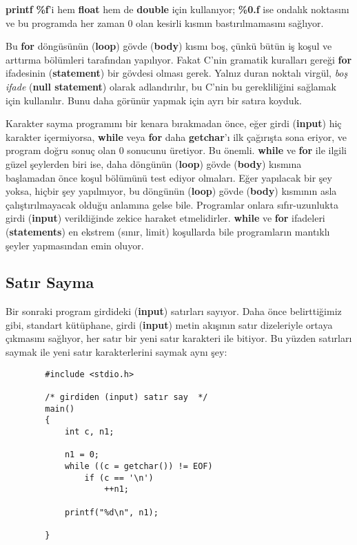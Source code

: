 \documentclass[a4paper,12pt,oneside]{book}
\begin{document}
\textbf{printf} \textbf{\%f}'i hem \textbf{float} hem de \textbf{double} için kullanıyor; \textbf{\%0.f} ise ondalık noktasını ve bu programda her zaman 0 olan kesirli kısmın bastırılmamasını sağlıyor.
\par Bu \textbf{for} döngüsünün (\textbf{loop}) gövde (\textbf{body}) kısmı boş, çünkü bütün iş koşul ve arttırma bölümleri tarafından yapılıyor. Fakat C'nin gramatik kuralları gereği \textbf{for} ifadesinin (\textbf{statement}) bir gövdesi olması gerek. Yalnız duran noktalı virgül, \textit{boş ifade} (\textbf{null statement}) olarak adlandırılır, bu C'nin bu gerekliliğini sağlamak için kullanılır. Bunu daha görünür yapmak için ayrı bir satıra koyduk.
\par Karakter sayma programını bir kenara bırakmadan önce, eğer girdi (\textbf{input}) hiç karakter içermiyorsa, \textbf{while} veya \textbf{for} daha \textbf{getchar}'ı ilk çağırışta sona eriyor, ve program doğru sonuç olan 0 sonucunu üretiyor. Bu önemli. \textbf{while} ve \textbf{for} ile ilgili güzel şeylerden biri ise, daha döngünün (\textbf{loop}) gövde (\textbf{body}) kısmına başlamadan önce koşul bölümünü test ediyor olmaları. Eğer yapılacak bir şey yoksa, hiçbir şey yapılmıyor, bu döngünün (\textbf{loop}) gövde (\textbf{body}) kısmının asla çalıştırılmayacak olduğu anlamına gelse bile. Programlar onlara sıfır-uzunlukta girdi (\textbf{input}) verildiğinde zekice haraket etmelidirler. \textbf{while} ve \textbf{for} ifadeleri (\textbf{statements}) en ekstrem (sınır, limit) koşullarda bile programların mantıklı şeyler yapmasından emin oluyor.

\subsection{Satır Sayma}

Bir sonraki program girdideki (\textbf{input}) satırları sayıyor. Daha önce belirttiğimiz gibi, standart kütüphane, girdi (\textbf{input}) metin akışının satır dizeleriyle ortaya çıkmasını sağlıyor, her satır bir yeni satır karakteri ile bitiyor. Bu yüzden satırları saymak ile yeni satır karakterlerini saymak aynı şey:

\begin{lstlisting}
		#include <stdio.h>

		/* girdiden (input) satır say  */
		main()
		{
			int c, n1;

			n1 = 0;
			while ((c = getchar()) != EOF)
				if (c == '\n')
					++n1;

			printf("%d\n", n1);

		}
\end{lstlisting}
\end{document}
